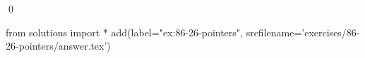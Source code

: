 
\begin{ex}
  \label{ex:86-26-pointers}
  
  \qed
\end{ex}
\begin{python0}
from solutions import *
add(label="ex:86-26-pointers",
    srcfilename='exercises/86-26-pointers/answer.tex')
\end{python0}
